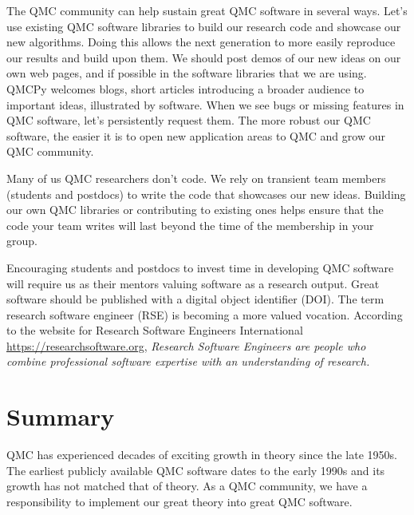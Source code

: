\documentclass[graybox]{svmult}
\begin{document}
The QMC community can help sustain great QMC software in several ways.  Let's use existing QMC software libraries to build our research code and showcase our new algorithms.  Doing this allows the next generation to more easily reproduce our results and build upon them.  We should post demos of our new ideas on our own web pages, and if possible in the software libraries that we are using.  QMCPy welcomes blogs, short articles introducing a broader audience to important ideas, illustrated by software.  When we see bugs or missing features in QMC software, let's persistently request them.  The more robust our QMC software, the easier it is to open new application areas to QMC and grow our QMC community.

Many of us QMC researchers don't code.  We rely on transient team members (students and postdocs) to write the code that showcases our new ideas.  Building our own QMC libraries or contributing to existing ones helps ensure that the code your team writes will last beyond the time of the membership in your group. 

Encouraging students and postdocs to invest time in developing QMC software will require us as their mentors valuing software as a research output.  Great software should be published with a digital object identifier (DOI).  The term research software engineer (RSE) is becoming a more valued vocation.  According to the website for  Research Software Engineers International 	\url{https://researchsoftware.org}, \emph{Research Software Engineers are people who combine professional software expertise with an understanding of research.}

\section{Summary}
QMC has experienced decades of exciting growth in theory since the late 1950s.  The earliest publicly available QMC software dates to the early 1990s and its growth has not matched that of theory.  As a QMC community, we have a responsibility to implement our great theory into great QMC software.




\end{document}
